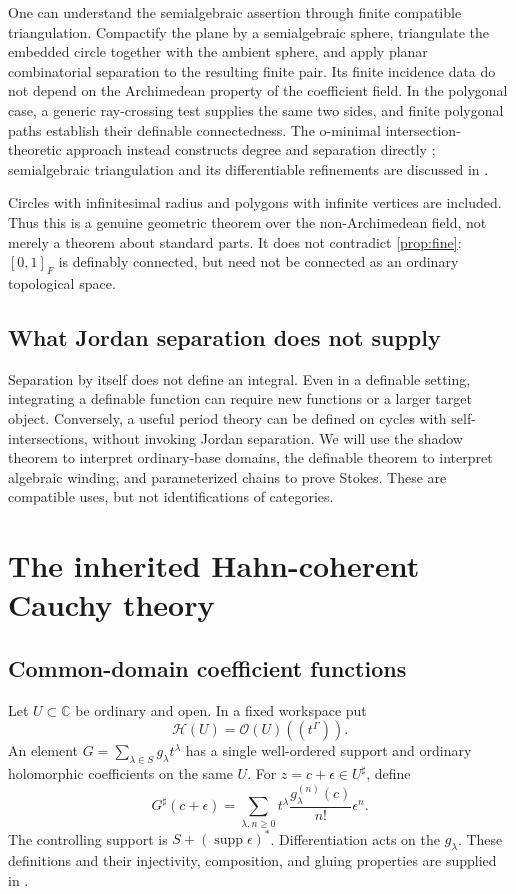 \documentclass[11pt,letterpaper]{article}
\theoremstyle{definition}
\theoremstyle{remark}
\newcommand{\C}{\mathbb C}
\newcommand{\OO}{\mathcal O}
\newcommand{\HH}{\mathcal H}
\newcommand{\supp}{\operatorname{supp}}
\newcommand{\sh}{^{\sharp}}
\numberwithin{equation}{section}
\begin{document}
One can understand the semialgebraic assertion through finite compatible triangulation. Compactify the plane by a semialgebraic sphere, triangulate the embedded circle together with the ambient sphere, and apply planar combinatorial separation to the resulting finite pair. Its finite incidence data do not depend on the Archimedean property of the coefficient field. In the polygonal case, a generic ray-crossing test supplies the same two sides, and finite polygonal paths establish their definable connectedness. The o-minimal intersection-theoretic approach instead constructs degree and separation directly \cite{BO}; semialgebraic triangulation and its differentiable refinements are discussed in \cite{OS}.

Circles with infinitesimal radius and polygons with infinite vertices are included. Thus this is a genuine geometric theorem over the non-Archimedean field, not merely a theorem about standard parts. It does not contradict \cref{prop:fine}: $[0,1]_F$ is definably connected, but need not be connected as an ordinary topological space.

\subsection{What Jordan separation does not supply}
Separation by itself does not define an integral. Even in a definable setting, integrating a definable function can require new functions or a larger target object. Conversely, a useful period theory can be defined on cycles with self-intersections, without invoking Jordan separation. We will use the shadow theorem to interpret ordinary-base domains, the definable theorem to interpret algebraic winding, and parameterized chains to prove Stokes. These are compatible uses, but not identifications of categories.

\section{The inherited Hahn-coherent Cauchy theory}\label{sec:cauchy}
\subsection{Common-domain coefficient functions}
Let $U\subset\C$ be ordinary and open. In a fixed workspace put
\[
\HH(U)=\OO(U)((t^\Gamma)).
\]
An element $G=\sum_{\lambda\in S}g_\lambda t^\lambda$ has a single well-ordered support and ordinary holomorphic coefficients on the same $U$. For $z=c+\epsilon\in U\sh$, define
\begin{equation}\label{eq:evaluate}
G\sh(c+\epsilon)=\sum_{\lambda,n\ge0}
 t^\lambda\frac{g_\lambda^{(n)}(c)}{n!}\epsilon^n.
\end{equation}
The controlling support is $S+(\supp\epsilon)^*$. Differentiation acts on the $g_\lambda$. These definitions and their injectivity, composition, and gluing properties are supplied in \cite[\S5]{SA}.
\end{document}
